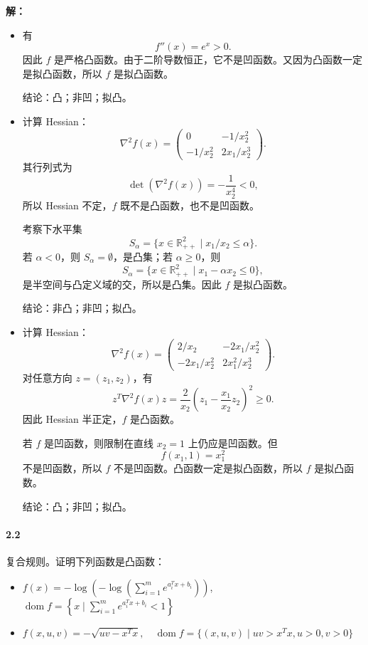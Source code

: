 \documentclass[12pt,a4paper]{article}
\begin{document}
\textbf{解：}
\begin{itemize}
  \item[(a)] 有
  \[
    f''(x)=e^x>0.
  \]
  因此 $f$ 是严格凸函数。由于二阶导数恒正，它不是凹函数。又因为凸函数一定是拟凸函数，所以 $f$ 是拟凸函数。

  结论：凸；非凹；拟凸。

  \item[(b)] 计算 Hessian：
  \[
    \nabla^2 f(x)=
    \begin{pmatrix}
      0 & -1/x_2^2\\
      -1/x_2^2 & 2x_1/x_2^3
    \end{pmatrix}.
  \]
  其行列式为
  \[
    \det(\nabla^2 f(x))=-\frac{1}{x_2^4}<0,
  \]
  所以 Hessian 不定，$f$ 既不是凸函数，也不是凹函数。

  考察下水平集
  \[
    S_\alpha=\{x\in\mathbb{R}_{++}^2\mid x_1/x_2\leq \alpha\}.
  \]
  若 $\alpha<0$，则 $S_\alpha=\emptyset$，是凸集；若 $\alpha\geq 0$，则
  \[
    S_\alpha=\{x\in\mathbb{R}_{++}^2\mid x_1-\alpha x_2\leq 0\},
  \]
  是半空间与凸定义域的交，所以是凸集。因此 $f$ 是拟凸函数。

  结论：非凸；非凹；拟凸。

  \item[(c)] 计算 Hessian：
  \[
    \nabla^2 f(x)=
    \begin{pmatrix}
      2/x_2 & -2x_1/x_2^2\\
      -2x_1/x_2^2 & 2x_1^2/x_2^3
    \end{pmatrix}.
  \]
  对任意方向 $z=(z_1,z_2)$，有
  \[
    z^T\nabla^2 f(x)z
    =\frac{2}{x_2}\left(z_1-\frac{x_1}{x_2}z_2\right)^2\geq 0.
  \]
  因此 Hessian 半正定，$f$ 是凸函数。

  若 $f$ 是凹函数，则限制在直线 $x_2=1$ 上仍应是凹函数。但
  \[
    f(x_1,1)=x_1^2
  \]
  不是凹函数，所以 $f$ 不是凹函数。凸函数一定是拟凸函数，所以 $f$ 是拟凸函数。

  结论：凸；非凹；拟凸。
\end{itemize}



\paragraph{2.2} 复合规则。证明下列函数是凸函数：
\begin{itemize}
  \item[(a)] $f(x) = -\log\left(-\log\left(\sum_{i=1}^m e^{a_i^T x + b_i}\right)\right)$, \quad $\operatorname{dom} f = \left\{ x \mid \sum_{i=1}^m e^{a_i^T x + b_i} < 1 \right\}$
  \item[(b)] $f(x,u,v) = -\sqrt{uv - x^T x}, \quad \operatorname{dom} f = \{(x,u,v) \mid uv > x^T x, u > 0, v > 0\}$
\end{itemize}
\end{document}
